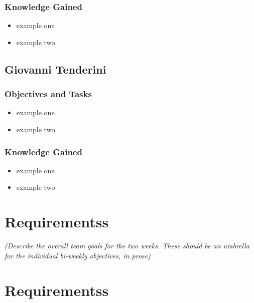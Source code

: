 \hypertarget{knowledge-gained-1}{%
\subsubsection{Knowledge Gained}\label{knowledge-gained-1}}

\begin{itemize}
\tightlist
\item
  example one
\item
  example two
\end{itemize}

\hypertarget{giovanni-tenderini}{%
\subsection{Giovanni Tenderini}\label{giovanni-tenderini}}

\hypertarget{objectives-and-tasks-2}{%
\subsubsection{Objectives and Tasks}\label{objectives-and-tasks-2}}

\begin{itemize}
\tightlist
\item
  example one
\item
  example two
\end{itemize}

\hypertarget{knowledge-gained-2}{%
\subsubsection{Knowledge Gained}\label{knowledge-gained-2}}

\begin{itemize}
\tightlist
\item
  example one
\item
  example two
\end{itemize}

\hypertarget{requirementss}{%
\section{Requirementss}\label{requirementss}}

\emph{(Describe the overall team goals for the two weeks. These should
be an umbrella for the individual bi-weekly objectives, in prose)}

\hypertarget{requirementss-1}{%
\section{Requirementss}\label{requirementss-1}}

